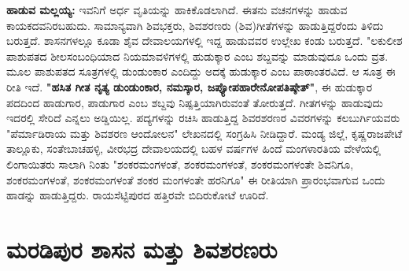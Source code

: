 \textbf{ಹಾಡುವ ಮಲ್ಲಯ್ಯ:} ಇವನಿಗೆ ಅರ್ಧ ವೃತಿಯನ್ನು ಹಾಕಿಕೊಡಲಾಗಿದೆ. ಈತನು ವಚನಗಳನ್ನು ಹಾಡುವ ಕಾಯಕದವನಿರಬಹುದು. ಸಾಮಾನ್ಯವಾಗಿ ಶಿವಭಕ್ತರು, ಶಿವಶರಣರು (ಶಿವ)ಗೀತೆಗಳನ್ನು ಹಾಡುತ್ತಿದ್ದರೆಂದು ತಿಳಿದು ಬರುತ್ತದೆ. ಶಾಸನಗಳಲ್ಲೂ ಕೂಡಾ ಶೈವ ದೇವಾಲಯಗಳಲ್ಲಿ ಇದ್ದ ಹಾಡುವವರ ಉಲ್ಲೇಖ ಕಂಡು ಬರುತ್ತದೆ. "ಲಕುಲೀಶ ಪಾಶುಪತದ ಶೀಲಸಂಬಂಧಿಯಾದ ನಿಯಮಾವಳಿಗಳಲ್ಲಿ ಹುಡುಕ್ಕಾರ ಎಂಬ ಶಬ್ದವನ್ನು ಮಾಡುವುದೂ ಒಂದು ವ್ರತ. ಮೂಲ ಪಾಶುಪತದ ಸೂತ್ರಗಳಲ್ಲಿ ಡುಂಡುಂಕಾರ ಎಂದಿದ್ದು ಅದಕ್ಕೆ ಹುಡುಕ್ಕಾರ ಎಂಬ ಪಾಠಾಂತರವಿದೆ. ಆ ಸೂತ್ರ ಈ ರೀತಿ ಇದೆ. \textbf{"ಹಸಿತ ಗೀತ ನೃತ್ಯ ಡುಂಡುಂಕಾರ, ನಮಸ್ಕಾರ, ಜಪ್ಯೋಪಹಾರೇನೋಪತಿಷ್ಠೇತ್​"}, ಈ ಹುಡುಕ್ಕಾರ ಪದದಿಂದ ಹಾಡುಗಾರ, ಪಾಡುಗಾರ ಎಂಬ ಶಬ್ದವು ನಿಷ್ಪತ್ತಿಯಾಗಿರುವಂತೆ ತೋರುತ್ತದೆ. ಗೀತಗಳನ್ನು ಹಾಡುವುದು ಇದರಲ್ಲಿ ಸೇರಿದೆ ಎನ್ನಲು ಅಡ್ಡಿಯಿಲ್ಲ. ಪದ್ಯಗಳನ್ನು ರಚಿಸಿ ಹಾಡುತ್ತಿದ್ದ ಶಿವರಶರಣರ ವಿವರಗಳನ್ನು ಕಲಬುರ್ಗಿಯವರು "ಪೆರ್ಮಾಡಿರಾಯ ಮತ್ತು ಶಿವಶರಣ ಆಂದೋಲನ" ಲೇಖನದಲ್ಲಿ ಸಂಗ್ರಹಿಸಿ ನೀಡಿದ್ದಾರೆ. ಮಂಡ್ಯ ಜಿಲ್ಲೆ, ಕೃಷ್ಣರಾಜಪೇಟೆ ತಾಲ್ಲೂಕು, ಸಂತೇಬಾಚಹಳ್ಳಿ, ವೀರಭದ್ರ ದೇವಾಲಯದಲ್ಲಿ ಬಹಳ ವರ್ಷಗಳ ಹಿಂದೆ ಮಂಗಳಾರತಿಯ ವೇಳೆಯಲ್ಲಿ ಲಿಂಗಾಯಿತರು ಸಾಲಾಗಿ ನಿಂತು "ಶಂಕರಮಂಗಳಂತೆ, ಶಂಕರಮಂಗಳಂತೆ, ಶಂಕರಮಂಗಳಂತೇ ಶಿವನಿಗೂ, ಶಂಕರಮಂಗಳಂತೆ, ಶಂಕರಮಂಗಳಂತೆ ಶಂಕರ ಮಂಗಳಂತೇ ಹರನಿಗೂ" ಈ ರೀತಿಯಾಗಿ ಪ್ರಾರಂಭವಾಗುವ ಒಂದು ಹಾಡನ್ನು ಹಾಡುತ್ತಿದ್ದರು. ರಾಯಸೆಟ್ಟಿಪುರದ ಹತ್ತಿರವೇ ಬಿದಿರುಕೋಟೆ ಊರಿದೆ.

\section*{ಮರಡಿಪುರ ಶಾಸನ ಮತ್ತು ಶಿವಶರಣರು}

